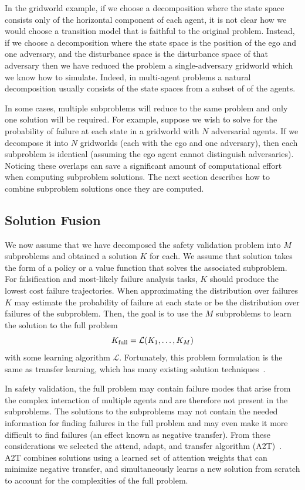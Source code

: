 In the gridworld example, if we choose a decomposition where the state space consists only of the horizontal component of each agent, it is not clear how we would choose a transition model that is faithful to the original problem. Instead, if we choose a decomposition where the state space is the position of the ego and one adversary, and the disturbance space is the disturbance space of that adversary then we have reduced the problem a single-adversary gridworld which we know how to simulate. Indeed, in multi-agent problems a natural decomposition usually consists of the state spaces from a subset of of the agents. 

In some cases, multiple subproblems will reduce to the same problem and only one solution will be required. For example, suppose we wish to solve for the probability of failure at each state in a gridworld with $N$ adversarial agents. If we decompose it into $N$ gridworlds (each with the ego and one adversary), then each subproblem is identical (assuming the ego agent cannot distinguish adversaries). Noticing these overlaps can save a significant amount of computational effort when computing subproblem solutions. The next section describes how to combine subproblem solutions once they are computed. 

\subsection{Solution Fusion}
We now assume that we have decomposed the safety validation problem into $M$ subproblems and obtained a solution $K$ for each. We assume that solution takes the form of a policy or a value function that solves the associated subproblem. For falsification and most-likely failure analysis tasks, $K$ should produce the lowest cost failure trajectories. When approximating the distribution over failures $K$ may estimate the probability of failure at each state or be the distribution over failures of the subproblem. Then, the goal is to use the $M$ subproblems to learn the solution to the full problem 
\begin{equation}
K_{\rm full} = \mathcal{L}(K_1, \ldots, K_M) \label{eq:ch6_solution_fusion}
\end{equation}
with some learning algorithm $\mathcal{L}$. Fortunately, this problem formulation is the same as transfer learning, which has many existing solution techniques~\cite{taylor2009transfer}.

In safety validation, the full problem may contain failure modes that arise from the complex interaction of multiple agents and are therefore not present in the subproblems. The solutions to the subproblems may not contain the needed information for finding failures in the full problem and may even make it more difficult to find failures (an effect known as negative transfer). From these considerations we selected the attend, adapt, and transfer algorithm (A2T)~\cite{rajendran2017attend}. A2T combines solutions using a learned set of attention weights that can minimize negative transfer, and simultaneously learns a new solution from scratch to account for the complexities of the full problem. 

